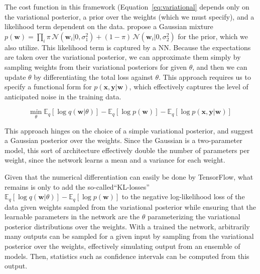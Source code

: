 \documentclass{agujournal2018}
\begin{document}

The cost function in this framework (Equation~\ref{eq:variational} depends only on the variational posterior, a prior over the weights (which we must specify), and a likelihood term dependent on the data. \cite{Blundell2015} propose a Gaussian mixture $ p(\mathbf{w}) = \prod_i \pi \, \mathcal{N}(\mathbf{w}_i \vert 0, \sigma_1^2) + (1-\pi)\,\mathcal{N}(\mathbf{w}_i \vert 0, \sigma_2^2)$ for the prior, which we also utilize. This likelihood term is captured by a NN. Because the expectations are taken over the variational posterior, we can approximate them simply by sampling weights from their variational posteriors for given $\theta$, and then we can update $\theta$ by differentiating the total loss against $\theta$. This approach requires us to specify a functional form for $p(\mathbf{x}, \mathbf{y} \vert \mathbf{w})$, which effectively captures the level of anticipated noise in the training data.

\begin{equation}
    \underset{\theta}{\text{min}} \; \mathbb{E}_q \left[ \log q(\mathbf{w} \vert \theta)\right] - \mathbb{E}_q \left[ \log p(\mathbf{w}) \right] - \mathbb{E}_q \left[ \log p(\mathbf{x}, \mathbf{y} \vert \mathbf{w})\right]  \label{eq:variational}
\end{equation}

This approach hinges on the choice of a simple variational posterior, and \cite{Blundell2015} suggest a Gaussian posterior over the weights. Since the Gaussian is a two-parameter model, this sort of architecture effectively double the number of parameters per weight, since the network learns a mean and a variance for each weight. 

Given that the numerical differentiation can easily be done by TensorFlow, what remains is only to add the so-called``KL-losses'' $ \mathbb{E}_q \left[ \log q(\mathbf{w} \vert \theta)\right] - \mathbb{E}_q \left[ \log p(\mathbf{w}) \right]$ to the negative log-likelihood loss of the data given weights sampled from the variational posterior while ensuring that the learnable parameters in the network are the $\theta$ parameterizing the variational posterior distributions over the weights. With a trained the network, arbitrarily many outputs can be sampled for a given input by sampling from the variational posterior over the weights, effectively simulating output from an ensemble of models. Then, statistics such as confidence intervals can be computed from this output.
\end{document}
